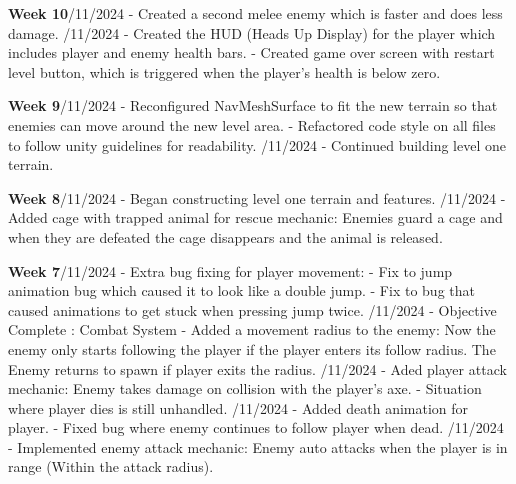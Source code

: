 \documentclass[10pt]{final_report}
\begin{document}
\textbf{Week 10}/11/2024
\newline- Created a second melee enemy which is faster and does less damage.
/11/2024
\newline- Created the HUD (Heads Up Display) for the player which includes player and enemy health bars.
\newline- Created game over screen with restart level button, which is triggered when the player's health is below zero.
 
\textbf{Week 9}/11/2024
\newline- Reconfigured NavMeshSurface to fit the new terrain so that enemies can move around the new level area.
\newline- Refactored code style on all files to follow unity guidelines for readability.
/11/2024
\newline- Continued building level one terrain.

\textbf{Week 8}/11/2024
\newline- Began constructing level one terrain and features.
/11/2024
\newline- Added cage with trapped animal for rescue mechanic: Enemies guard a cage and when they are defeated the cage disappears and the animal is released.

\textbf{Week 7}/11/2024
\newline- Extra bug fixing for player movement:
\newline- Fix to jump animation bug which caused it to look like a double jump.
\newline- Fix to bug that caused animations to get stuck when pressing jump twice.
/11/2024 - Objective Complete : Combat System
\newline- Added a movement radius to the enemy: Now the enemy only starts following the player if the player enters its follow radius. The Enemy returns to spawn if player exits the radius.
/11/2024
\newline- Aded player attack mechanic: Enemy takes damage on collision with the player's axe.
\newline- Situation where player dies is still unhandled.
/11/2024
\newline- Added death animation for player.
\newline- Fixed bug where enemy continues to follow player when dead.
/11/2024
\newline- Implemented enemy attack mechanic: Enemy auto attacks when the player is in range (Within the attack radius).
\end{document}
